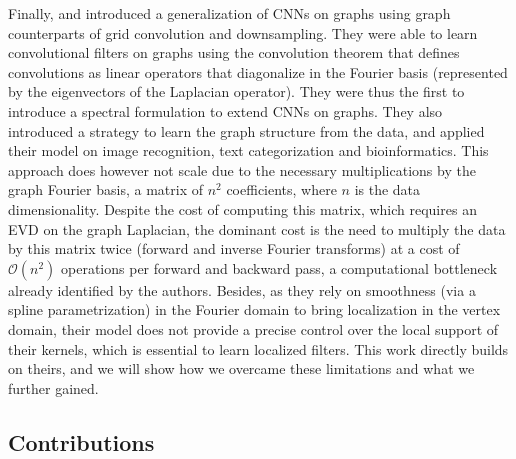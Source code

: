 \documentclass{article}
\newcommand{\bO}{\mathcal{O}}
\begin{document}
Finally, \cite{art:BrunaZarembaSzlamLeCun13DLgraphs} and
\cite{art:HenaffBrunaLeCun15DLgraphs} introduced a generalization of CNNs on
graphs using graph counterparts of grid convolution and downsampling. They were
able to learn convolutional filters on graphs using the convolution theorem
\cite{book:Mallat99wavelets} that defines convolutions as linear operators that
diagonalize in the Fourier basis (represented by the eigenvectors of the
Laplacian operator). They were thus the first to introduce a spectral
formulation to extend CNNs on graphs. They also introduced a strategy to learn
the graph structure from the data, and applied their model on image recognition,
text categorization and bioinformatics. This approach does however not scale due
to the necessary multiplications by the graph Fourier basis, a matrix of $n^2$
coefficients, where $n$ is the data dimensionality. Despite the cost of
computing this matrix, which requires an EVD on the graph Laplacian, the
dominant cost is the need to multiply the data by this matrix twice (forward and
inverse Fourier transforms) at a cost of $\bO(n^2)$ operations per forward and
backward pass, a computational bottleneck already identified by the authors.
Besides, as they rely on smoothness (via a spline parametrization) in the
Fourier domain to bring localization in the vertex domain, their model does not
provide a precise control over the local support of their kernels, which is
essential to learn localized filters. This work directly builds on theirs, and
we will show how we overcame these limitations and what we further gained.

\subsection{Contributions}
\end{document}
